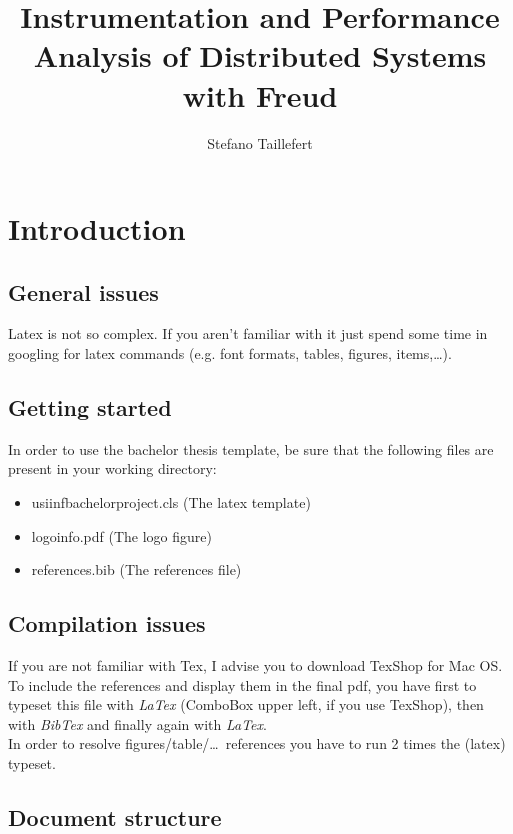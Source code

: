 \documentclass[]{usiinfbachelorproject}
\author{Stefano Taillefert}
\title{Instrumentation and Performance Analysis of Distributed Systems with Freud}
\begin{document}
\maketitle

\section{Introduction} \label{introduction}

\subsection{General issues}

Latex is not so complex. If you aren't familiar with it just spend some time in googling for latex commands (e.g. font formats, tables, figures, items,\dots).

\subsection{Getting started}
In order to use the bachelor thesis template, be sure that the following files are present in your working directory:
\begin{itemize}
\item usiinfbachelorproject.cls (The latex template)
\item logoinfo.pdf (The logo figure)
\item references.bib (The references file)\\
\end{itemize}

\subsection {Compilation issues}

If you are not familiar with Tex, I advise you to download TexShop for Mac OS.\\
To include the references and display them in the final pdf, you have first to typeset this file with \textit{LaTex} (ComboBox upper left, if you use TexShop), then with \textit{BibTex} and finally again with \textit{LaTex}.\\
In order to resolve figures/table/\dots~references you have to run 2 times the (latex) typeset.

\subsection {Document structure}
\end{document}
